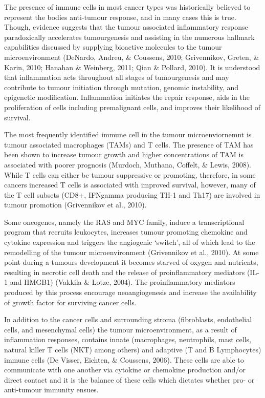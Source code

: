 \documentclass[a4paper, twoside]{templates/ociamthesis}
\begin{document}
The presence of immune cells in most cancer types was historically believed to represent the bodies anti-tumour response, and in many cases this is true. Though, evidence suggests that the tumour associated inflammatory response paradoxically accelerates tumourgenesis and assisting in the numerous hallmark capabilities discussed by supplying bioactive molecules to the tumour microenvironment (DeNardo, Andreu, \& Coussens, 2010; Grivennikov, Greten, \& Karin, 2010; Hanahan \& Weinberg, 2011; Qian \& Pollard, 2010). It is understood that inflammation acts throughout all stages of tumourgenesis and may contribute to tumour initiation through mutation, genomic instability, and epigenetic modification. Inflammation initiates the repair response, aids in the proliferation of cells including premalignant cells, and improves their likelihood of survival.

The most frequently identified immune cell in the tumour microenviornemnt is tumour associated macrophages (TAMs) and T cells. The presence of TAM has been shown to increase tumour growth and higher concentrations of TAM is associated with poorer prognosis (Murdoch, Muthana, Coffelt, \& Lewis, 2008). While T cells can either be tumour suppressive or promoting, therefore, in some cancers increased T cells is associated with improved survival, however, many of the T cell subsets (CD8+, IFNgamma producing TH-1 and Th17) are involved in tumour promotion (Grivennikov et al., 2010).

Some oncogenes, namely the RAS and MYC family, induce a transcriptional program that recruits leukocytes, increases tumour promoting chemokine and cytokine expression and triggers the angiogenic `switch', all of which lead to the remodelling of the tumour microenvironment (Grivennikov et al., 2010). At some point during a tumours development it becomes starved of oxygen and nutrients, resulting in necrotic cell death and the release of proinflammatory mediators (IL-1 and HMGB1) (Vakkila \& Lotze, 2004). The proinflammatory mediators produced by this process encourage neoangiogenesis and increase the availability of growth factor for surviving cancer cells.

In addition to the cancer cells and surrounding stroma (fibroblasts, endothelial cells, and mesenchymal cells) the tumour microenvironment, as a result of inflammation responses, contains innate (macrophages, neutrophils, mast cells, natural killer T cells (NKT) among others) and adaptive (T and B Lymphocytes) immune cells (De Visser, Eichten, \& Coussens, 2006). These cells are able to communicate with one another via cytokine or chemokine production and/or direct contact and it is the balance of these cells which dictates whether pro- or anti-tumour immunity ensues.
\end{document}
